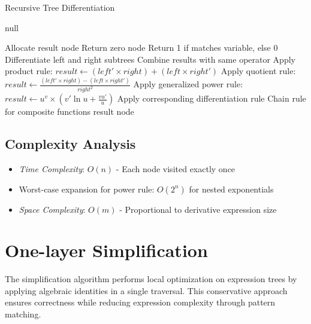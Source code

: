 \documentclass{report}
\begin{document}
\begin{algorithm}[H]
\caption{Recursive Tree Differentiation}
\begin{algorithmic}[1]
        \State \Return null
    \EndIf
    
    \State Allocate result node
        \State Return zero node
        \State Return 1 if matches variable, else 0
        \State Differentiate left and right subtrees
        \State Combine results with same operator
        \State Apply product rule:
        \State $result \gets (left' \times right) + (left \times right')$
        \State Apply quotient rule:
        \State $result \gets \frac{(left' \times right) - (left \times right')}{right^2}$
        \State Apply generalized power rule:
        \State $result \gets u^v \times (v'\ln u + \frac{vu'}{u})$
        \State Apply corresponding differentiation rule
        \State Chain rule for composite functions
    \EndIf
    \State \Return result node
\EndFunction
\end{algorithmic}
\end{algorithm}

\subsection*{Complexity Analysis}

\begin{itemize}
    \item \textit{Time Complexity}: $O(n)$ - Each node visited exactly once
    \item Worst-case expansion for power rule: $O(2^n)$ for nested exponentials
    \item \textit{Space Complexity}: $O(m)$ - Proportional to derivative expression size
\end{itemize}


\section{One-layer Simplification}

The simplification algorithm performs local optimization on expression trees by applying algebraic identities in a single traversal. This conservative approach ensures correctness while reducing expression complexity through pattern matching.
\end{document}
